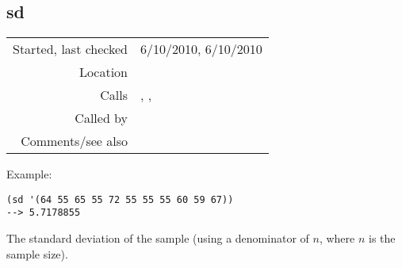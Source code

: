 \subsection*{sd}\label{fun:sd}

\vspace{0.3cm}
\begin{tabular}{r|p{8cm}}
Started, last checked & 6/10/2010, 6/10/2010 \\
Location & \nameref{sec:stats-sampling} \\
Calls & \nameref{fun:fibonacci-list}, \nameref{fun:mean}, \nameref{fun:my-last} \\
Called by & \nameref{fun:rhythmic-variability} \\
Comments/see also & 
\end{tabular}

\vspace{0.5cm}
\noindent Example:
\begin{verbatim}
(sd '(64 55 65 55 72 55 55 55 60 59 67))
--> 5.7178855
\end{verbatim}

\noindent The standard deviation of the sample (using
a denominator of $n$, where $n$ is the sample
size).





